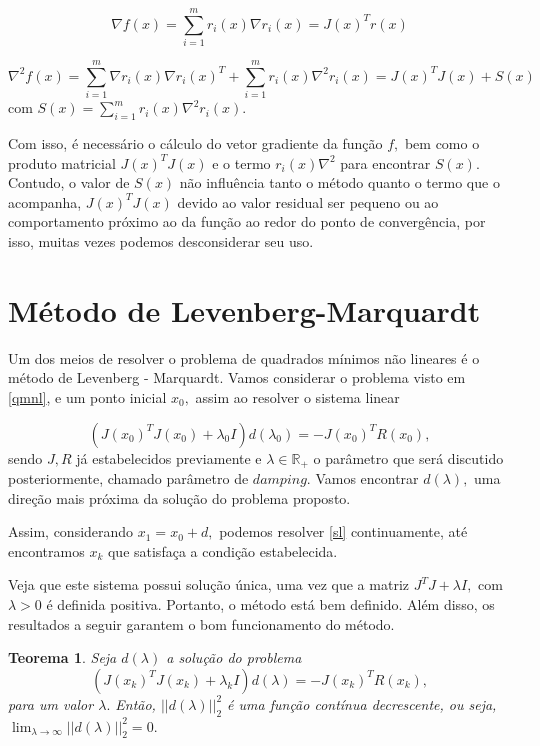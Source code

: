 \documentclass[12pt,a4paper]{article}
\newtheorem{teo}{Teorema}[section]
\begin{document}
	\[\nabla f(x) = \sum_{i=1}^{m} r_i(x)\nabla r_i(x) = J(x)^{T}r(x)\]
	
	\[\nabla^{2} f(x) = \sum_{i=1}^{m} \nabla r_i(x)\nabla r_i(x)^{T}
	+ \sum_{i=1}^{m} r_i(x) \nabla^{2}r_i(x) = J(x)^{T}J(x) + S(x)\]
	com $S(x) = \sum_{i=1}^{m} r_i(x)\nabla^{2}r_i(x).$
	
	Com isso, é necessário o cálculo do vetor gradiente da função $f,$ bem como o produto matricial $J(x)^{T}J(x)$ e o termo $r_i(x)\nabla^{2}$ para encontrar $S(x).$ Contudo, o valor de $S(x)$ não influência tanto o método quanto o termo que o acompanha, $J(x)^{T}J(x)$ devido ao valor residual ser pequeno ou ao comportamento próximo ao da função ao redor do ponto de convergência, por isso, muitas vezes podemos desconsiderar seu uso.
	
	\section{Método de Levenberg-Marquardt}\label{lm}
	
	Um dos meios de resolver o problema de quadrados mínimos não lineares é o método de Levenberg - Marquardt. Vamos considerar o problema visto em \ref{qmnl}, e um ponto inicial $x_0,$ assim ao resolver o sistema linear
	 
	\begin{equation*} 
	(J(x_0)^{T}J(x_0) + \lambda_0 I ) d(\lambda_0) = - J(x_0)^T R(x_0),
	\end{equation*}
	sendo $J, R$ já estabelecidos previamente e $\lambda \in \mathbb{R}_+$ o parâmetro que será discutido posteriormente, chamado parâmetro de $damping.$ Vamos encontrar $d(\lambda),$ uma direção mais próxima da solução do problema proposto.
	
	Assim, considerando $x_1 = x_0 + d,$ podemos resolver \ref{sl} continuamente, até encontramos $x_k$ que satisfaça a condição estabelecida.
	
	Veja que este sistema possui solução única, uma vez que a matriz $J^{T}J + \lambda I,$ com $\lambda > 0$ é definida positiva. Portanto, o método está bem definido. Além disso, os resultados a seguir garantem o bom funcionamento do método.
	
	\begin{teo}
		Seja $d(\lambda)$ a solução do problema 
		\begin{equation} \label{sl}
		(J(x_k)^{T}J(x_k) + \lambda_k I ) d(\lambda) = - J(x_k)^T R(x_k),
		\end{equation}
		para um valor $\lambda.$ Então, $||d(\lambda)||_2^2$ é uma função contínua decrescente, ou seja, $\lim_{\lambda\rightarrow \infty}{||d(\lambda)||_2^2} = 0.$
	\end{teo}
	
\end{document}
